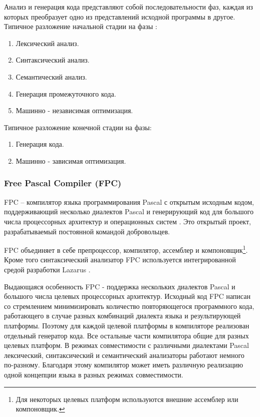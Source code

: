 \documentclass{imcs}
\begin{document}
Анализ и генерация кода представляют собой последовательности фаз, каждая из которых
преобразует одно из представлений исходной программы в другое. Типичное разложение
начальной стадии на фазы \cite{dragonbook}:
\begin{enumerate}
    \item Лексический анализ.
    \item Синтаксический анализ.
    \item Семантический анализ.
    \item Генерация промежуточного кода.
    \item Машинно - независимая оптимизация.
\end{enumerate}
Типичное разложение конечной стадии на фазы:
\begin{enumerate}      
    \item Генерация кода.
    \item Машинно - зависимая оптимизация.
\end{enumerate}

\subsubsection{Free Pascal Compiler (FPC)}
FPC -- компилятор языка программирования Pascal с открытым исходным
кодом, поддерживающий несколько диалектов Pascal и генерирующий код для большого
числа процессорных архитектур и операционных систем \cite{fpc}. Это открытый проект,
разрабатываемый постоянной командой добровольцев.

FPC объединяет в себе препроцессор, компилятор, ассемблер и 
компоновщик\footnote{Для некоторых целевых платформ используются внешние ассемблер или компоновщик.}.
Кроме того синтаксический анализатор FPC используется интегрированной средой разработки
Lazarus \cite{lazarus}.

Выдающаяся особенность FPC - поддержка нескольких диалектов Pascal 
и большого числа целевых процессорных архитектур. Исходный код FPC написан со
стремлением минимизировать количество повторяющегося программного кода,
работающего в случае разных комбинаций диалекта языка и результирующей
платформы. Поэтому для каждой целевой платформы
в компиляторе реализован отдельный генератор кода. Все остальные части компилятора общие для
разных целевых платформ. В режимах совместимости с различными диалектами Pascal лексический,
синтаксический и семантический анализаторы работают немного по-разному. Благодаря этому
компилятор может иметь различную реализацию одной концепции языка в разных режимах
совместимости.
\end{document}
